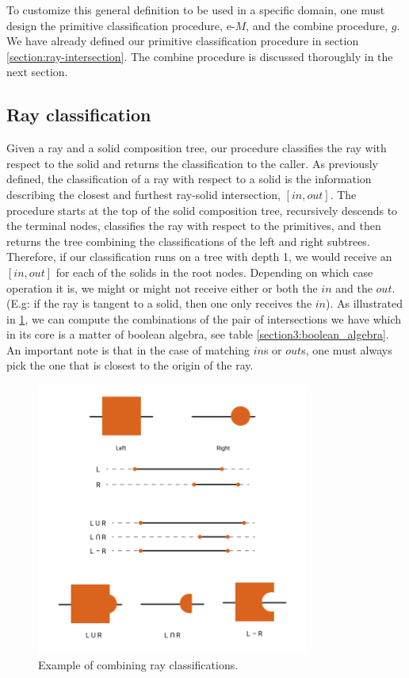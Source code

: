 \documentclass[a4paper,11pt,oneside]{article}
\begin{document}
To customize this general definition to be used in a specific domain, one must design the primitive classification procedure, e-$M$, and the combine procedure, $g$. We have already defined our primitive classification procedure in section \ref{section:ray-intersection}. The combine procedure is discussed thoroughly in the next section.

\subsection{Ray classification}

Given a ray and a solid composition tree, our procedure classifies the ray with respect to the solid and returns the classification to the caller. As previously defined, the classification of a ray with respect to a solid is the information describing the closest and furthest ray-solid intersection, $[in, out]$. The procedure starts at the top of the solid composition tree, recursively descends to the terminal nodes, classifies the ray with respect to the primitives, and then returns the tree combining the classifications of the left and right subtrees. Therefore, if our classification runs on a tree with depth 1, we would receive an $[in, out]$ for each of the solids in the root nodes. Depending on which case operation it is, we might or might not receive either or both the $in$ and the $out$. (E.g: if the ray is tangent to a solid, then one only receives the $in$). As illustrated in \ref{sect3.3:classification}, we can compute the combinations of the pair of intersections we have which in its core is a matter of boolean algebra, see table \ref{section3:boolean_algebra}. An important note is that in the case of matching $in$s or $out$s, one must always pick the one that is closest to the origin of the ray.

\begin{figure}[ht]
	\begin{center}
		\includegraphics[width=0.8\textwidth]{section3/3.3/ray-classifications.png}
	\end{center}
	\caption{Example of combining ray classifications.}
	\label{sect3.3:classification}
\end{figure}
\end{document}
